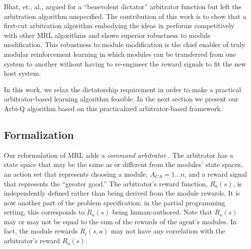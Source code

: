 Bhat, et., al., \cite{bhat2006on-the-difficulty} argued for a ``benevolent dictator'' arbitrator function but left the arbitration algorithm unspecified.  The contribution of this work is to show that a first-cut arbitration algorithm embodying the ideas in \cite{bhat2006on-the-difficulty} performs competitively with other MRL algorithms and shows superior robustness to module modification.  This robustness to module modification is the chief enabler of truly modular reinforcement learning in which modules can be transferred from one system to another without having to re-engineer the reward signals to fit the new host system.

In this work, we relax the dictatorship requirement in order to make a practical arbitrator-based learning algorithm feasible.  In the next section we present our Arbi-Q algorithm based on this practicalized arbitrator-based framework.




\subsection{Formalization}

Our reformulation of MRL adds a {\em command arbitrator} \cite{brooks1986a-robust}.  The arbitrator has a state space that may be the same as or different from the modules' state spaces, an action set that represents choosing a module, $A_{CA} = {1 ... n}$, and a reward signal that represents the ``greater good.'' The arbitrator's reward function, $R_a(s)$, is independently defined rather than being derived from the module rewards.  It is now another part of the problem specification; in the partial programming setting, this corresponds to $R_a(s)$ being human-authored. Note that $R_a(s)$ may or may not be equal to the sum of the rewards of the agent's modules. In fact, the module rewards $R_i(s,a)$ may not have any correlation with the arbitrator's reward $R_a(s)$.

